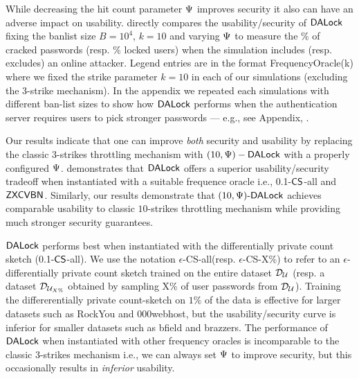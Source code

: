\label{section:ExperimentResult-security}
While decreasing the hit count parameter $\Psi$ improves security it also can have an adverse impact on usability.   
 directly compares the usability/security of $\mathsf{DALock}$ fixing the banlist size $B=10^4$, $k=10$ and varying $\Psi$ to measure the $\%$ of cracked passwords (resp. $\%$ locked users) when the simulation includes (resp. excludes) an online attacker.  Legend entries are in the format FrequencyOracle(k) where we fixed the strike parameter $k=10$ in each of our simulations (excluding the 3-strike mechanism). In the appendix we repeated each simulations with different ban-list sizes  to show how $\mathsf{DALock}$ performs when the authentication server requires users to pick stronger passwords --- e.g., see Appendix, .


Our results indicate that one can improve {\em both} security and usability by replacing the classic 3-strikes throttling mechanism with $(10,\Psi)-\mathsf{DALock}$ with a properly configured $\Psi$.  demonstrates that $\mathsf{DALock}$ offers a superior usability/security tradeoff when instantiated with a suitable frequence oracle i.e., 0.1-$\mathsf{CS}$-all and $\mathsf{ZXCVBN}$. Similarly, our results demonstrate that $(10, \Psi)\text{-}\mathsf{DALock}$  achieves comparable usability to classic $10$-strikes throttling mechanism while providing much stronger security guarantees. 

$\mathsf{DALock}$ performs best when instantiated with the differentially private count sketch (0.1-$\mathsf{CS}$-all). We use the notation $\epsilon$-CS-all(resp. $\epsilon$-CS-X\%) to refer to an $\epsilon$-differentially private count sketch trained on the entire dataset $\mathcal{D}_{{\mathcal{U}}}$ (resp. a dataset $\mathcal{D}_{{\mathcal{U}_{X\%}}}$ obtained by sampling X\% of user passwords from $\mathcal{D}_{{\mathcal{U}}}$). Training the differerentially private count-sketch on $1\%$ of the data is effective for larger datasets such as RockYou and 000webhost, but the usability/security curve is inferior for smaller datasets such as bfield and brazzers. The performance of $\mathsf{DALock}$ when instantiated with other frequency oracles is incomparable to the classic $3$-strikes mechanism i.e., we can always set $\Psi$ to improve security, but this occasionally results in {\em inferior} usability. 




\vspace*{-\baselineskip}

